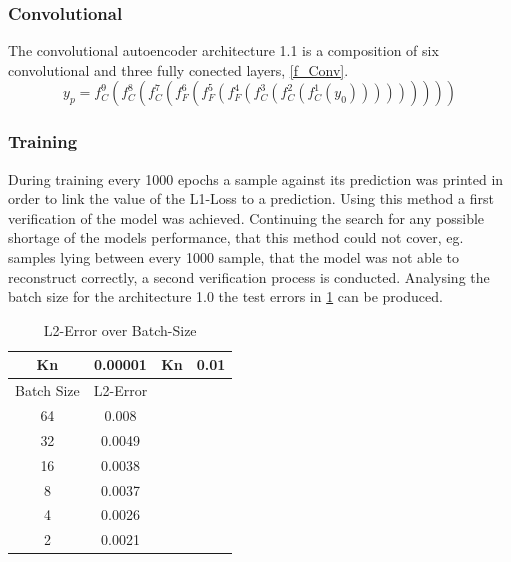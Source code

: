 \documentclass[12pt, a4paper]{article}
\begin{document}
\subsubsection{Convolutional}\label{Convolutional}
The convolutional autoencoder architecture 1.1 is a composition of six convolutional and three fully conected layers, \cref{f_Conv}.
\begin{equation}
y_p = f_{C}^9(f_{C}^8(f_{C}^7(f_{F}^6(f_{F}^5(f_{F}^4(f_{C}^3(f_{C}^2(f_{C}^1(y_0)))))))))
\label{f_Conv}
\end{equation}
\subsubsection{Training}
During training every 1000 epochs a sample against its prediction was printed in order to link the value of the L1-Loss to a prediction. Using this method a first verification of the model was achieved. Continuing the search for any possible shortage of the models performance, that this method could not cover, eg. samples lying between every 1000 sample, that the model was not able to reconstruct correctly, a second verification process is conducted.
Analysing the batch size for the architecture 1.0 the test errors in \cref{Tab:Batch} can be produced.
\begin{table}[!htbp]\centering
	\begin{tabular}{ |c c|c c| }
		\hline
		Kn & 0.00001& Kn &0.01  \\ [.5ex]
		\hline
		Batch Size & L2-Error && \\ \hline
		64 & 0.008  &&\\ 
		32 & 0.0049 &&\\ \hline
		16 & 0.0038 &&\\ \hline
		8 & 0.0037&&\\ \hline
		4 & 0.0026&&\\ \hline
		2 & 0.0021&&\\
		\hline
	\end{tabular}
	\caption{L2-Error over Batch-Size}
	\label{Tab:Batch}
\end{table}
\end{document}
